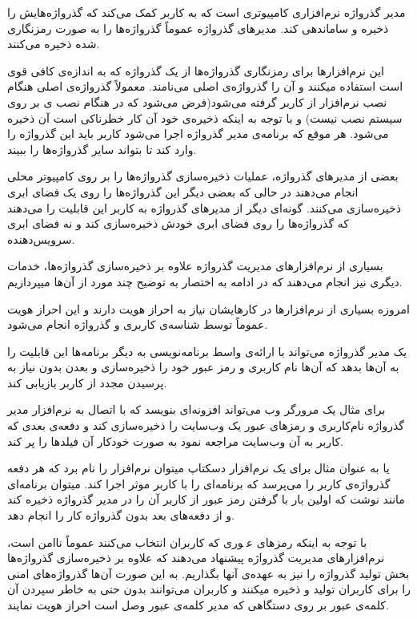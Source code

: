 
مدیر گذرواژه نرم‌افزاری کامپیوتری است که به کاربر کمک می‌کند که گذرواژه‌هایش را ذخیره و ساماندهی کند. مدیر‌های گذرواژه عموماً گذرواژه‌ها را به صورت رمزنگاری شده ذخیره می‌کنند. 

این نرم‌افزارها برای رمزنگاری گذرواژه‌ها از یک گذرواژه‌ که به اندازه‌ی کافی قوی است استفاده میکنند و آن را گذرواژه‌ی اصلی می‌نامند. معمولاً گذرواژه‌ی اصلی هنگام نصب نرم‌افزار از کاربر گرفته می‌شود(فرض می‌شود که در هنگام نصب ی بر روی سیستم نصب نیست) و با توجه به اینکه ذخیره‌ی خود آن کار خطرناکی است  آن ذخیره می‌شود. هر موقع که برنامه‌ی مدیر گذرواژه اجرا می‌شود کاربر باید این گذرواژه را وارد کند تا بتواند سایر گذرواژه‌ها را ببیند.

بعضی از مدیر‌های گذرواژه، عملیات ذخیره‌سازی گذرواژه‌ها را بر روی کامپیوتر محلی انجام می‌دهند در حالی که بعضی دیگر این گذرواژه‌ها را روی یک فضای ابری ذخیره‌سازی می‌کنند. گونه‌ای دیگر از مدیر‌های گذرواژه  به کاربر این قابلیت را می‌دهند که گذرواژه‌ها را روی فضای ابری خودش ذخیره‌سازی کند و نه فضای ابری سرویس‌دهنده.

بسیاری از نرم‌افزار‌های مدیریت گذرواژه علاوه بر ذخیره‌سازی گذرواژه‌ها، خدمات دیگری نیز انجام می‌دهند که در ادامه به اختصار به توضیح چند مورد از آن‌ها میپردازیم.


امروزه بسیاری از نرم‌افزارها در کارهایشان نیاز به احراز هویت دارند و این احراز هویت عموماً توسط شناسه‌ی کاربری و گذرواژه انجام می‌شود. 

یک مدیر گذرواژه می‌تواند با ارائه‌ی واسط برنامه‌نویسی به دیگر برنامه‌ها این قابلیت را به آن‌ها بدهد که آن‌ها نام کاربری و رمز عبور خود را ذخیره‌سازی و بعدن بدون نیاز به پرسیدن مجدد از کاربر بازیابی کند.

برای مثال یک مرورگر وب می‌تواند افزونه‌ای بنویسد که با اتصال به نرم‌افزار مدیر گذرواژه نام‌کاربری و رمز‌های عبور یک وب‌سایت را ذخیره‌سازی کند و دفعه‌ی بعدی که کاربر به آن وب‌سایت مراجعه نمود به صورت خودکار آن فیلد‌ها را پر کند. 

یا به عنوان مثال برای یک نرم‌افزار دسکتاپ میتوان نرم‌افزار  را نام برد که هر دفعه گذرواژه‌ی کاربر را می‌پرسد که برنامه‌ای را با کاربر موثر  اجرا کند. میتوان برنامه‌ای مانند  نوشت که اولین بار با گرفتن رمز عبور از کاربر آن را در مدیر گذرواژه ذخیره کند و از دفعه‌های بعد بدون گذرواژه کار را انجام دهد.


با توجه به اینکه رمزهای عبٖوری که کاربران انتخاب می‌کنند عموماً ناامن است، نرم‌افزارهای مدیریت گذرواژه پیشنهاد می‌دهند که علاوه بر ذخیره‌سازی گذرواژه‌ها بخش تولید گذرواژه را نیز به عهده‌ی آنها بگذاریم. به این صورت آن‌ها گذرواژه‌های امنی را برای کاربران تولید و ذخیره میکنند و کاربران می‌توانند بدون حتی به خاطر سپردن آن کلمه‌ی عبور بر روی دستگاهی که مدیر کلمه‌ی عبور وصل است احراز هویت نمایند.

